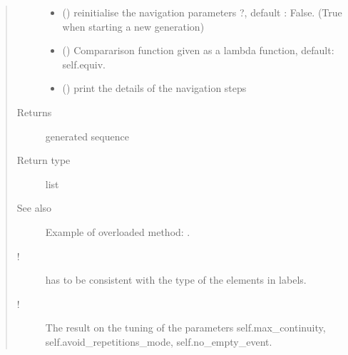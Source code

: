 \documentclass[letterpaper,10pt,english]{sphinxmanual}
\begin{document}
\begin{fulllineitems}
\begin{fulllineitems}
\begin{quote}
\begin{description}
\begin{itemize}
\item {} 
 () \textendash{} reinitialise the navigation parameters ?, default : False. (True when starting a new generation)

\item {} 
 () \textendash{} Compararison function given as a lambda function, default: self.equiv.

\item {} 
 () \textendash{} print the details of the navigation steps

\end{itemize}

\item[{Returns}] \leavevmode
generated sequence

\item[{Return type}] \leavevmode
list

\item[{See also}] \leavevmode
Example of overloaded method: .

\item[{!}] \leavevmode
{} has to be consistent with the type of the elements in labels.

\item[{!}] \leavevmode
The result  on the tuning of the parameters self.max\_continuity, self.avoid\_repetitions\_mode, self.no\_empty\_event.

\end{description}\end{quote}

\end{fulllineitems}



\end{fulllineitems}
\end{document}
